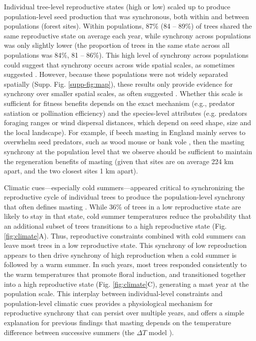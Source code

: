\documentclass[11pt]{article}
\begin{document}
Individual tree-level reproductive states (high or low) scaled up to produce population-level seed production that was synchronous, both within and between populations (forest sites). Within populations, 87\%  (84 -- 89\%) of trees shared the same reproductive state on average each year, while synchrony across populations was only slightly lower (the proportion of trees in the same state across all populations was 84\%, 81 -- 86\%). This high level of synchrony across populations could suggest that synchrony occurs across wide spatial scales, as sometimes suggested \citep{Bogdziewicz2021a, Journe2024}. However, because these populations were not widely separated spatially (Supp. Fig. \ref{supp-fig:map}), these results only provide evidence for synchrony over smaller spatial scales, as often suggested  \citep{Koenig1998, LaMontagne2020}. %
Whether this scale is sufficient for fitness benefits depends on the exact mechanism (e.g., predator satiation or pollination efficiency) and the species-level attributes (e.g. predators foraging ranges or wind dispersal distances, which depend on seed shape, size and the local landscape\citep{Davies2024}). For example, if beech masting in England mainly serves to overwhelm seed predators, such as wood mouse or bank vole \citep{Sachser2025}, then the masting synchrony at the population level that we observe should be sufficient to maintain the regeneration benefits of masting (given that sites are on average 224 km apart, and the two closest sites 1 km apart).

Climatic cues---especially cold summers---appeared critical to synchronizing the reproductive cycle of individual trees to produce the population-level synchrony that often defines masting \citep{Kelly2002}. While 36\% of trees in a low reproductive state are likely to stay in that state, cold summer temperatures reduce the probability that an additional subset of trees transitions to a high reproductive state (Fig. \ref{fig:climate}A).
Thus, reproductive constraints combined with cold summers can leave most trees in a low reproductive state. This synchrony of low reproduction appears to then drive synchrony of high reproduction when a cold summer is followed by a warm summer. In such years, most trees responded consistently to the warm temperatures that promote floral induction, and transitioned together into a high reproductive state (Fig. \ref{fig:climate}C), generating a mast year at the population scale. This interplay between individual-level constraints and population-level climatic cues provides a physiological mechanism for reproductive synchrony that can persist over multiple years, and offers a simple explanation for previous findings that masting depends on the temperature difference between successive summers (the $\Delta T$ model \citealp{Kelly2012}). %
\end{document}
